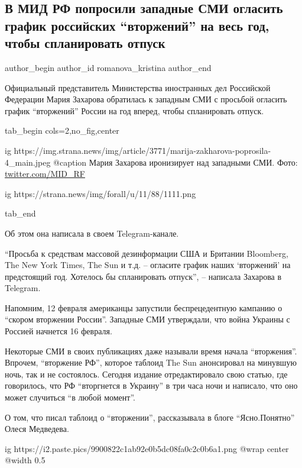  
 
 
 
 
 
\subsection{В МИД РФ попросили западные СМИ огласить график российских \enquote{вторжений} на весь год, чтобы спланировать отпуск}
\label{sec:15_02_2022.stz.news.ua.strana.4.zaharova_grafik_vtorzhenij}
 
\ifcmt
 author_begin
   author_id romanova_kristina
 author_end
\fi

Официальный представитель Министерства иностранных дел Российской Федерации
Мария Захарова обратилась к западным СМИ с просьбой огласить график \enquote{вторжений}
России на год вперед, чтобы спланировать отпуск.

\ifcmt
tab_begin cols=2,no_fig,center

  ig https://img.strana.news/img/article/3771/marija-zakharova-poprosila-4_main.jpeg
	@caption Мария Захарова иронизирует над западными СМИ. Фото: \url{twitter.com/MID_RF}

  ig https://strana.news/img/forall/u/11/88/1111.png

tab_end
\fi

Об этом она написала в своем Telegram-канале.

\enquote{Просьба к средствам массовой дезинформации США и Британии Bloomberg, The New
York Times, The Sun и т.д. – огласите график наших \enquote{вторжений} на предстоящий
год. Хотелось бы спланировать отпуск}, – написала Захарова в Telegram.

Напомним, 12 февраля американцы запустили беспрецедентную кампанию о \enquote{скором
вторжении России}. Западные СМИ утверждали, что война Украины с Россией
начнется 16 февраля. 

Некоторые СМИ в своих публикациях даже называли время начала \enquote{вторжения}.
Впрочем, \enquote{вторжение РФ}, которое таблоид The Sun анонсировал на минувшую ночь,
так и не состоялось. Сегодня издание отредактировало свою статью, где
говорилось, что РФ \enquote{вторгнется в Украину} в три часа ночи и написало, что оно
может случиться \enquote{в любой момент}. 

О том, что писал таблоид о \enquote{вторжении}, рассказывала в блоге \enquote{Ясно.Понятно}
Олеся Медведева.

\ifcmt
  ig https://i2.paste.pics/9900822c1ab92e0b5dc08fa0c2c0b6a1.png
  @wrap center
  @width 0.5
\fi
